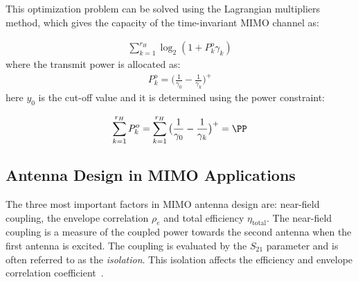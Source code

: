 This optimization problem can be solved using the Lagrangian multipliers method, which gives the capacity of the time-invariant MIMO channel as: 

\begin{align*}
  \sum_{k=1}^{r_H} \log_2 (1 + P^o_k\gamma_k)
\end{align*}
where the transmit power is allocated as: 
\begin{align*}
  P_k^o = \big(\frac{1}{\gamma_0} - \frac{1}{\gamma_k}\big)^+ 
\end{align*}
here $y_0$ is the cut-off value and it is determined using the power constraint: 

\begin{align*}
  \sum_{k=1}^{r_H} P_k^o = \sum_{k=1}^{r_H} \big(\frac{1}{\gamma_0} - \frac{1}{\gamma_k}\big)^+ = \PP
\end{align*}

\subsection{Antenna Design in MIMO Applications}
The three most important factors in MIMO antenna design are: near-field coupling, the envelope correlation $\rho_e$ and total efficiency $\eta_{\text{total}}$. The near-field coupling is a measure of the coupled power towards the second antenna when the first antenna is excited. The coupling is evaluated by the $S_{21}$ parameter and is often referred to as the \emph{isolation}. This isolation affects the efficiency and envelope correlation coefficient~\cite{Tatomirescu2011PortIsolation}. 

